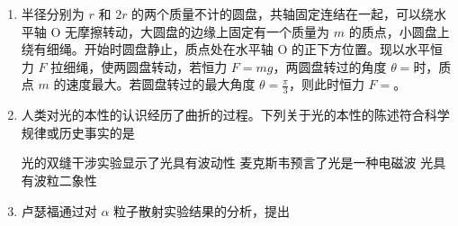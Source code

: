 \documentclass[\gkver]{gaokaozhenti}
\begin{document}
\begin{enumerate}
\onepicture[align=right, w=3.78cm]{}



\item
半径分别为 $r$ 和 $2r$ 的两个质量不计的圆盘，共轴固定连结在一起，可以绕水平轴 O 无摩擦转动，大圆盘的边缘上固定有一个质量为 $m$ 的质点，小圆盘上绕有细绳。开始时圆盘静止，质点处在水平轴 O 的正下方位置。现以水平恒力 $F$ 拉细绳，使两圆盘转动，若恒力 $F=mg$，两圆盘转过的角度 $\theta=$时，质点 $m$ 的速度最大。若圆盘转过的最大角度 $\theta=\frac{\pi}{3}$，则此时恒力 $F=$。

\onepicture[align=right, w=3.79cm]{}



\item
人类对光的本性的认识经历了曲折的过程。下列关于光的本性的陈述符合科学规律或历史事实的是

{光的双缝干涉实验显示了光具有波动性}
{麦克斯韦预言了光是一种电磁波}
{光具有波粒二象性}


\item
卢瑟福通过对 $\alpha$ 粒子散射实验结果的分析，提出


\end{enumerate}
\end{document}
